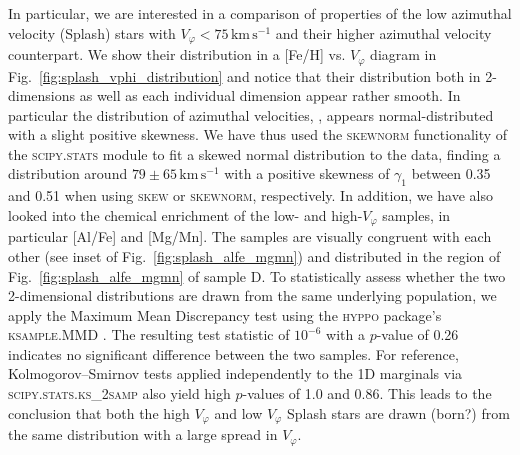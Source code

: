 \documentclass[fleqn,usenatbib]{mnras}
\begin{document}
In particular, we are interested in a comparison of properties of the low azimuthal velocity (Splash) stars with $V_\varphi < 75\,\mathrm{km\,s^{-1}}$ and their higher azimuthal velocity counterpart. We show their distribution in a [Fe/H] vs. $V_\varphi$ diagram in Fig.~\ref{fig:splash_vphi_distribution} and notice that their distribution both in 2-dimensions as well as each individual dimension appear rather smooth. In particular the distribution of azimuthal velocities, , appears normal-distributed with a slight positive skewness. We have thus used the \textsc{skewnorm} functionality of the \textsc{scipy.stats} module \citep{Scipy} to fit a skewed normal distribution to the data, finding a distribution around $79 \pm 65\,\mathrm{km\,s^{-1}}$ with a positive skewness of $\gamma_1$ between 0.35 and 0.51 when using \textsc{skew} or \textsc{skewnorm}, respectively. In addition, we have also looked into the chemical enrichment of the low- and high-$V_\varphi$ samples, in particular [Al/Fe] and [Mg/Mn]. The samples are visually congruent with each other (see inset of Fig.~\ref{fig:splash_alfe_mgmn}) and distributed in the region of Fig.~\ref{fig:splash_alfe_mgmn} of sample D. To statistically assess whether the two 2-dimensional distributions are drawn from the same underlying population, we apply the Maximum Mean Discrepancy test \citep{Gretton2012} using the \textsc{hyppo} package's \textsc{ksample.MMD} \citep{hyppo}. The resulting test statistic of $10^{-6}$ with a $p$-value of 0.26 indicates no significant difference between the two samples. For reference, Kolmogorov–Smirnov tests \citep{Hodges1958} applied independently to the 1D marginals via \textsc{scipy.stats.ks\_2samp} also yield high $p$-values of 1.0 and 0.86. This leads to the conclusion that both the high $V_\varphi$ and low $V_\varphi$ Splash stars are drawn (born?) from the same distribution with a large spread in $V_\varphi$.
\end{document}

